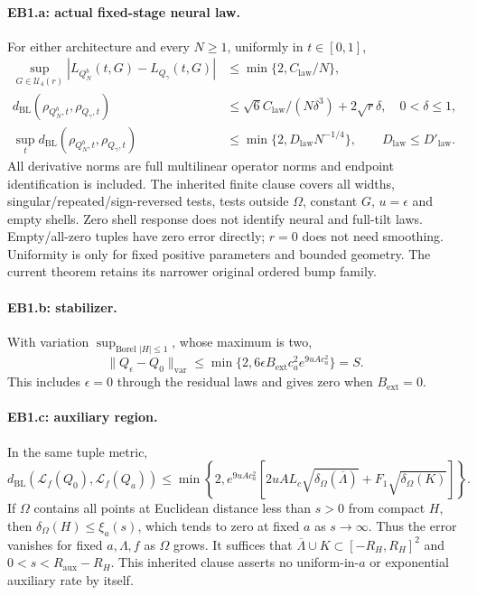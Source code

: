 \documentclass[11pt]{article}
\theoremstyle{plain}
\theoremstyle{definition}
\theoremstyle{remark}
\begin{document}
\paragraph{EB1.a: actual fixed-stage neural law.}
For either architecture and every $N\ge1$, uniformly in $t\in[0,1]$,
\begin{align*}
 \sup_{G\in\mathcal U_4(r)}|L_{Q_N^b}(t,G)-L_{Q_\gamma}(t,G)|
 &\le\min\{2,C_{\mathrm{law}}/N\},\\
 d_{\mathrm{BL}}(\rho_{Q_N^b,t},\rho_{Q_\gamma,t})
 &\le\sqrt6C_{\mathrm{law}}/(N\delta^3)+2\sqrt r\delta,
 \quad0<\delta\le1,\\
 \sup_t d_{\mathrm{BL}}(\rho_{Q_N^b,t},\rho_{Q_\gamma,t})
 &\le\min\{2,D_{\mathrm{law}}N^{-1/4}\},\qquad
 D_{\mathrm{law}}\le D'_{\mathrm{law}}.
\end{align*}
All derivative norms are full multilinear operator norms and endpoint
identification is included. The inherited finite clause covers all widths,
singular/repeated/sign-reversed tests, tests outside $\Omega$, constant $G$,
$u=\epsilon$ and empty shells. Zero shell response does not identify neural
and full-tilt laws. Empty/all-zero tuples have zero error directly; $r=0$
does not need smoothing. Uniformity is only for fixed positive parameters
and bounded geometry. The current theorem retains its narrower original
ordered bump family.

\paragraph{EB1.b: stabilizer.}
With variation $\sup_{\text{Borel }|H|\le1}$, whose maximum is two,
\[
 \|Q_\epsilon-Q_0\|_{\mathrm{var}}
 \le\min\{2,6\epsilon B_{\mathrm{ext}}c_a^2e^{9uAc_a^2}\}=S.
\]
This includes $\epsilon=0$ through the residual laws and gives zero when
$B_{\mathrm{ext}}=0$.

\paragraph{EB1.c: auxiliary region.}
In the same tuple metric,
\[
 d_{\mathrm{BL}}(\mathcal L_f(Q_0),\mathcal L_f(Q_a))
 \le\min\left\{2,e^{9uAc_a^2}
 [2uAL_c\sqrt{\delta_\Omega(\overline\Lambda)}
                         +F_1\sqrt{\delta_\Omega(K)}]\right\}.
\]
If $\Omega$ contains all points at Euclidean distance less than $s>0$
from compact $H$, then $\delta_\Omega(H)\le\xi_a(s)$, which tends to
zero at fixed $a$ as $s\to\infty$. Thus the error vanishes for fixed
$a,\Lambda,f$ as $\Omega$ grows. It suffices that
$\overline\Lambda\cup K\subset[-R_H,R_H]^2$ and
$0<s<R_{\mathrm{aux}}-R_H$. This inherited clause asserts no
uniform-in-$a$ or exponential auxiliary rate by itself.
\end{document}
